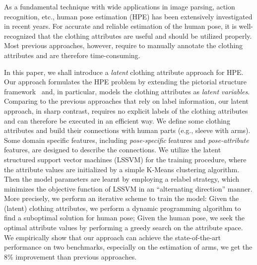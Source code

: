 \begin{englishabstract}
As a fundamental technique with wide applications in image parsing, action recognition, etc.,
human pose estimation (HPE) has been extensively investigated in recent years.
For accurate and reliable estimation of the human pose, it is well-recognized that the clothing attributes are useful and should be utilized properly.
Most previous approaches, however, require to manually annotate the clothing attributes and are therefore time-consuming.

In this paper, we shall introduce a \emph{latent} clothing attribute approach for HPE. Our approach formulates the HPE problem by extending the pictorial structure framework~\cite{ps1,ps2} and, in particular, models the clothing attributes as \emph{latent variables}. Comparing to the previous approaches that rely on label information, our latent approach, in sharp contrast, requires no explicit labels of the clothing attributes and can therefore be executed in an efficient way. We define some clothing attributes and build their connections with human parts (e.g., sleeve with arms). Some domain specific features, including \emph{pose-specific} features and \emph{pose-attribute} features, are designed to describe the connections. We utilize the latent structured support vector machines (LSSVM) for the training procedure, where the attribute values are initialized by a simple K-Means clustering algorithm. Then the model parameters are learnt by employing a relabel strategy, which minimizes the objective function of LSSVM in an ``alternating direction'' manner. More precisely, we perform an iterative scheme to train the model: Given the (latent) clothing attributes, we perform a dynamic programming algorithm to find a suboptimal solution for human pose; Given the human pose, we seek the optimal attribute values by performing a greedy search on the attribute space. We empirically show that our approach can achieve the state-of-the-art performance on two benchmarks, especially on the estimation of arms, we get the 8\% improvement than previous approaches.

\end{englishabstract}
